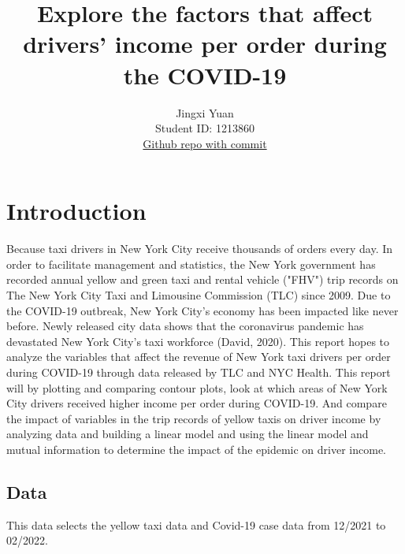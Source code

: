 \documentclass[11pt]{article}
\title{\textbf{Explore the factors that affect drivers' income per order during the COVID-19}}
\author{
Jingxi Yuan \\
Student ID: 1213860 \\
\href{https://github.com/MAST30034-Applied-Data-Science/mast30034\_p1\_template/tree/fd9f1dd17fdbcb5b119b70c93a22da8210d44fd7}{Github repo with commit}
}
\begin{document}
\maketitle

\section{Introduction}
Because taxi drivers in New York City receive thousands of orders every day. In order to facilitate management and statistics, the New York government has recorded annual yellow and green taxi and rental vehicle ("FHV") trip records on The New York City Taxi and Limousine Commission (TLC) since 2009. Due to the COVID-19 outbreak, New York City's economy has been impacted like never before. Newly released city data shows that the coronavirus pandemic has devastated New York City's taxi workforce (David, 2020)\cite{1}. This report hopes to analyze the variables that affect the revenue of New York taxi drivers per order during COVID-19 through data released by TLC and NYC Health.
This report will by plotting and comparing contour plots, look at which areas of New York City drivers received higher income per order during COVID-19. And compare the impact of variables in the trip records of yellow taxis on driver income by analyzing data and building a linear model and using the linear model and mutual information to determine the impact of the epidemic on driver income.
\subsection{Data}
This data selects the yellow taxi data and Covid-19 case data from 12/2021 to 02/2022.
\end{document}
